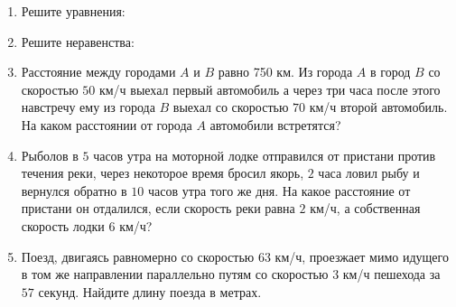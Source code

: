\documentclass[12pt, a4paper]{article}
\begin{document}
   \cfoot{}
\begin{enumerate}[label=\textbf{\arabic*.}]
	\item Решите уравнения:
	\begin{enumerate}[label=\asbuk*)]
	\end{enumerate}
	\item Решите неравенства: 
	\begin{enumerate}[label=\asbuk*)]
	\end{enumerate}
	\item Расстояние между городами $A$ и $B$ равно 750 км. Из города $A$ в город $B$ со скоростью $50$ км/ч выехал первый автомобиль а через три часа после этого навстречу ему из города $B$ выехал со скоростью $70$ км/ч второй автомобиль. На каком расстоянии от города $A$ автомобили встретятся?
	\item Рыболов в $5$ часов утра на моторной лодке отправился от пристани против течения реки, через некоторое время бросил якорь, $2$ часа ловил рыбу и вернулся обратно в $10$ часов утра того же дня. На какое расстояние от пристани он отдалился, если скорость реки равна $2$ км/ч, а собственная скорость лодки $6$	 км/ч?
	\item Поезд, двигаясь равномерно со скоростью $63$ км/ч, проезжает мимо идущего в том же направлении параллельно путям со скоростью $3$ км/ч пешехода за $57$ секунд. Найдите длину поезда в метрах.
\end{enumerate}
\end{document}
